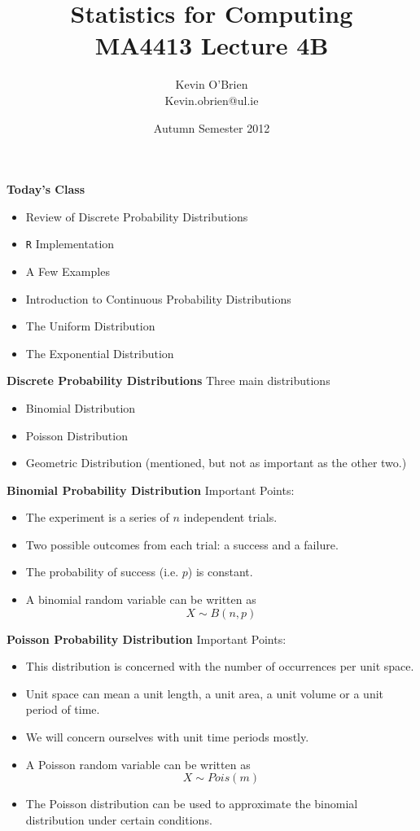 \documentclass[a4]{beamer}
\title[MA4413]{Statistics for Computing \\ {\normalsize MA4413 Lecture 4B}}
\author[Kevin O'Brien]{Kevin O'Brien \\ {\scriptsize Kevin.obrien@ul.ie}}
\date{Autumn Semester 2012}
\institute[Maths \& Stats]{Dept. of Mathematics \& Statistics, \\ University \textit{of} Limerick}
\begin{document}
\titlepage


{
\textbf{Today's Class}
\begin{itemize}
\item Review of Discrete Probability Distributions
\item \texttt{R} Implementation
\item A Few Examples
\item Introduction to Continuous Probability Distributions
\item The Uniform Distribution
\item The Exponential Distribution
\end{itemize}
}
{
\textbf{Discrete Probability Distributions}
Three main distributions
\begin{itemize}
\item Binomial Distribution
\item Poisson Distribution
\item Geometric Distribution (mentioned, but not as important as the other two.)
\end{itemize}
}
{
\textbf{Binomial Probability Distribution}
Important Points:
\begin{itemize}
\item The experiment is a series of $n$ independent trials.
\item Two possible outcomes from each trial: a success and a failure.
\item The probability of success (i.e. $p$) is constant. 
\item A binomial random variable can be written as 
\[ X \sim B(n,p) \]
\end{itemize}
}
{
\textbf{Poisson Probability Distribution}
Important Points:
\begin{itemize}
\item This distribution is concerned with the number of occurrences per unit space.
\item Unit space can mean a unit length, a unit area, a unit volume or a unit period of time.
\item We will concern ourselves with unit time periods mostly.
\item A Poisson random variable can be written as
\[ X \sim Pois(m) \]
\item The Poisson distribution can be used to approximate the binomial distribution under certain conditions.
\end{itemize}
}
\end{document}
